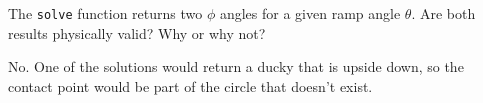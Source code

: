 The \texttt{solve} function returns two $\phi$ angles for a given ramp angle $\theta$. Are both results physically valid? Why or why not?

\begin{solution}
    No. One of the solutions would return a ducky that is upside down, so the contact point would be part of the circle that doesn't exist.
\end{solution}